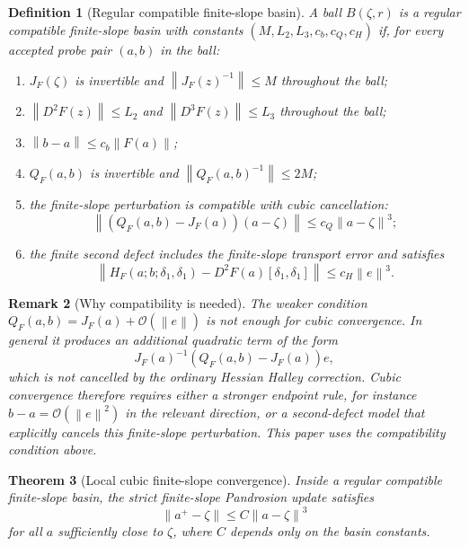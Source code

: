 \documentclass[11pt]{article}
\newtheorem{definition}{Definition}[section]
\newtheorem{theorem}[definition]{Theorem}
\newtheorem{remark}[definition]{Remark}
\newcommand{\OO}{\mathcal O}
\newcommand{\norm}[1]{\left\lVert #1\right\rVert}
\begin{document}
\begin{definition}[Regular compatible finite-slope basin]\label{def:basin}
A ball $B(\zeta,r)$ is a regular compatible finite-slope basin with constants $(M,L_2,L_3,c_b,c_Q,c_H)$ if, for every accepted probe pair $(a,b)$ in the ball:
\begin{enumerate}[label=(\roman*)]
\item $J_F(\zeta)$ is invertible and $\norm{J_F(z)^{-1}}\le M$ throughout the ball;
\item $\norm{D^2F(z)}\le L_2$ and $\norm{D^3F(z)}\le L_3$ throughout the ball;
\item $\norm{b-a}\le c_b\norm{F(a)}$;
\item $Q_F(a,b)$ is invertible and $\norm{Q_F(a,b)^{-1}}\le 2M$;
\item the finite-slope perturbation is compatible with cubic cancellation:
\[
        \norm{(Q_F(a,b)-J_F(a))(a-\zeta)}\le c_Q\norm{a-\zeta}^3;
\]
\item the finite second defect includes the finite-slope transport error and satisfies
\[
        \norm{H_F(a;b;\delta_1,\delta_1)-D^2F(a)[\delta_1,\delta_1]}
        \le c_H\norm{e}^3.
\]
\end{enumerate}
\end{definition}

\begin{remark}[Why compatibility is needed]
The weaker condition $Q_F(a,b)=J_F(a)+\OO(\norm e)$ is not enough for cubic convergence.  In general it produces an additional quadratic term of the form
\[
        J_F(a)^{-1}(Q_F(a,b)-J_F(a))e,
\]
which is not cancelled by the ordinary Hessian Halley correction.  Cubic convergence therefore requires either a stronger endpoint rule, for instance $b-a=\OO(\norm e^2)$ in the relevant direction, or a second-defect model that explicitly cancels this finite-slope perturbation.  This paper uses the compatibility condition above.
\end{remark}

\begin{theorem}[Local cubic finite-slope convergence]\label{thm:local-cubic}
Inside a regular compatible finite-slope basin, the strict finite-slope Pandrosion update satisfies
\[
        \norm{a^+-\zeta}\le C\norm{a-\zeta}^3
\]
for all $a$ sufficiently close to $\zeta$, where $C$ depends only on the basin constants.
\end{theorem}
\end{document}
